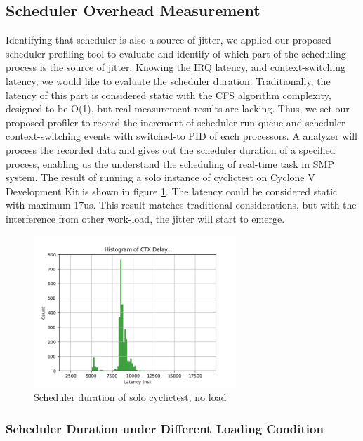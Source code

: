 \documentclass[conference]{IEEEtran}
\begin{document}
\subsection{Scheduler Overhead Measurement}
    
    Identifying that scheduler is also a source of jitter, we applied our proposed scheduler profiling tool to evaluate
    and identify of which part of the scheduling process is the source of jitter. Knowing the IRQ latency, and
    context-switching latency, we would like to evaluate the scheduler duration. Traditionally, the latency of this part
    is considered static with the CFS algorithm complexity, designed to be O(1), but real measurement results are
    lacking. Thus, we set our proposed profiler to record the increment of scheduler run-queue and scheduler
    context-switching events with switched-to PID of each processors. A analyzer will process the recorded data and
    gives out the scheduler duration of a specified process, enabling us the understand the scheduling of real-time task
    in SMP system. The result of running a solo instance of cyclictest on Cyclone V Development Kit is shown in figure
    \ref{fig:sd_noload}. The latency could be considered static with maximum 17us. This result matches traditional
    considerations, but with the interference from other work-load, the jitter will start to emerge.

    \begin{figure} \centering \includegraphics[width=3in]{img/sd-noload.png} \caption{Scheduler duration of solo
    cyclictest, no load} \label{fig:sd_noload} \end{figure}

\subsubsection{Scheduler Duration under Different Loading Condition}
\end{document}
